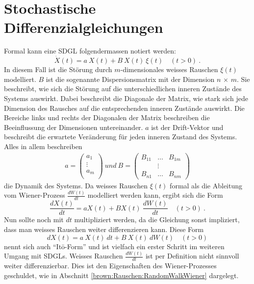 %
%
%
%

\section{Stochastische Differenzialgleichungen\label{brown:SDGL}}

Formal kann eine SDGL folgendermassen notiert werden: 
\begin{equation}
	\label{brown:SDGL:whiteNoise}
	\dot{X}(t) = a \ X(t) + B \ X(t) \ \xi(t) \quad (t>0) \ .
\end{equation}
In diesem Fall ist die Störung durch $ m $-dimensionales weisses Rauschen $ \xi(t) $ modelliert. $ B $ ist die sogenannte Dispersionsmatrix mit der Dimension $ n $ $\times $ $ m $. Sie beschreibt, wie sich die Störung auf die unterschiedlichen inneren Zustände des Systems auswirkt. Dabei beschreibt die Diagonale der Matrix, wie stark sich jede Dimension des Rausches auf die entsprechenden inneren Zustände auswirkt. Die Bereiche links und rechts der Diagonalen der Matrix beschreiben die Beeinflussung der Dimensionen untereinander. $ a $ ist der Drift-Vektor und beschreibt die erwartete Veränderung für jeden inneren Zustand des Systems. Alles in allem beschreiben
\begin{align*}
	a = 
	\begin{pmatrix}
		a_{1} \\
		\vdots \\
		a_{m}\\ 
	\end{pmatrix}
	\ und \
	B = 
	\begin{pmatrix}
		B_{11} & \dots & B_{1m} \\
		& \vdots & \\
		B_{n1} & \dots & B_{nm} 
	\end{pmatrix}
\end{align*}
die Dynamik des Systems. Da weisses Rauschen $ \xi(t) $ formal als die Ableitung vom Wiener-Prozess $ \frac{dW(t)}{dt} $ modelliert werden kann, ergibt sich die Form
\begin{equation}
	\frac{dX(t)}{dt} = aX(t) + BX(t) \ \frac{dW(t)}{dt} \quad (t>0) \ .
\end{equation}
Nun sollte noch mit $ dt $  multipliziert werden, da die Gleichung sonst impliziert, dass man weisses Rauschen weiter differenzieren kann. Diese Form
\begin{equation}
	dX(t) = a \ X(t) \ dt + B \ X(t) \ dW(t) \quad (t>0)
\end{equation}
nennt sich auch ``Itō-Form'' und ist vielfach ein erster Schritt im weiteren Umgang mit SDGLs.
Weisses Rauschen $ \frac{dW(t)}{dt} $ ist per Definition nicht sinnvoll weiter differenzierbar. Dies ist den Eigenschaften des Wiener-Prozesses geschuldet, wie in Abschnitt \ref{brown:Rauschen:RandomWalkWiener} dargelegt.



